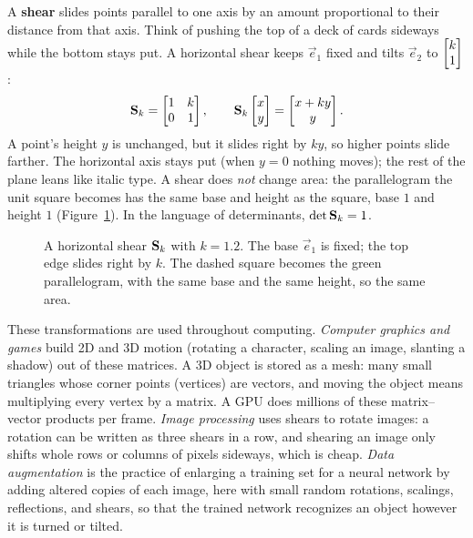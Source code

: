 A \textbf{shear} slides points parallel to one axis by an amount proportional to
their distance from that axis. Think of pushing the top of a deck of cards
sideways while the bottom stays put. A horizontal shear keeps $\vec{e}_1$ fixed
and tilts $\vec{e}_2$ to $\begin{bmatrix}k\\1\end{bmatrix}$:
\[
  \mathbf{S}_k = \begin{bmatrix} 1 & k \\ 0 & 1 \end{bmatrix},
  \qquad
  \mathbf{S}_k\begin{bmatrix}x\\y\end{bmatrix} = \begin{bmatrix}x + ky\\y\end{bmatrix}.
\]
A point's height $y$ is unchanged, but it slides right by $ky$, so higher points
slide farther. The horizontal axis stays put (when $y = 0$ nothing moves); the rest
of the plane leans like italic type. A shear does \emph{not} change
area: the parallelogram the unit square becomes has the same base and height as
the square, base $1$ and height $1$ (Figure~\ref{ch05:fig-shear}). In the language
of determinants, $\det \mathbf{S}_k = 1$.

\begin{figure}[H]
\centering
{}
\caption{A horizontal shear $\mathbf{S}_k$ with $k=1.2$. The base $\vec{e}_1$ is
fixed; the top edge slides right by $k$. The dashed
square becomes the green parallelogram, with the same base and the same height,
so the same area.}
\label{ch05:fig-shear}
\end{figure}

\begin{applicationbox}
These transformations are used throughout computing.
\emph{Computer graphics and games} build 2D and 3D motion (rotating a
character, scaling an image, slanting a shadow) out of these matrices. A 3D
object is stored as a mesh: many small triangles whose corner points (vertices)
are vectors, and moving the object means multiplying every vertex by a matrix. A
GPU does millions of these matrix--vector products per frame. \emph{Image
processing} uses shears to rotate images: a rotation can be written as three
shears in a row, and shearing an image only shifts whole rows or columns of
pixels sideways, which is cheap. \emph{Data augmentation} is the practice of
enlarging a training set for a neural network by adding altered copies of each
image, here with small random rotations, scalings, reflections, and shears, so
that the trained network recognizes an object however it is turned or tilted.
\end{applicationbox}

